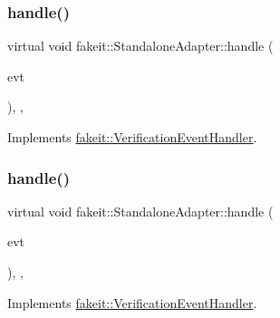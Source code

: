 \subsubsection{\texorpdfstring{handle()}{handle()}\hspace{0.1cm}{\footnotesize\ttfamily [2/6]}}
{\footnotesize\ttfamily virtual void fakeit\+::\+Standalone\+Adapter\+::handle (\begin{DoxyParamCaption}\item[{const \mbox{\hyperlink{structfakeit_1_1SequenceVerificationEvent}{Sequence\+Verification\+Event}} \&}]{evt }\end{DoxyParamCaption})\hspace{0.3cm}{\ttfamily [inline]}, {\ttfamily [override]}, {\ttfamily [virtual]}}



Implements \mbox{\hyperlink{structfakeit_1_1VerificationEventHandler_adf355a9888bc2bf78ce0e1219bfb1379}{fakeit\+::\+Verification\+Event\+Handler}}.

\mbox{\label{structfakeit_1_1StandaloneAdapter_aa8eee53eed1912200af8681e94587bef}} 
\subsubsection{\texorpdfstring{handle()}{handle()}\hspace{0.1cm}{\footnotesize\ttfamily [3/6]}}
{\footnotesize\ttfamily virtual void fakeit\+::\+Standalone\+Adapter\+::handle (\begin{DoxyParamCaption}\item[{const \mbox{\hyperlink{structfakeit_1_1NoMoreInvocationsVerificationEvent}{No\+More\+Invocations\+Verification\+Event}} \&}]{evt }\end{DoxyParamCaption})\hspace{0.3cm}{\ttfamily [inline]}, {\ttfamily [override]}, {\ttfamily [virtual]}}



Implements \mbox{\hyperlink{structfakeit_1_1VerificationEventHandler_a826b9d15e23bad7013b219d8e45ef1d0}{fakeit\+::\+Verification\+Event\+Handler}}.

\mbox{\label{structfakeit_1_1StandaloneAdapter_aad5bb15b86423092172ba7ee0df7a7f8}} 
